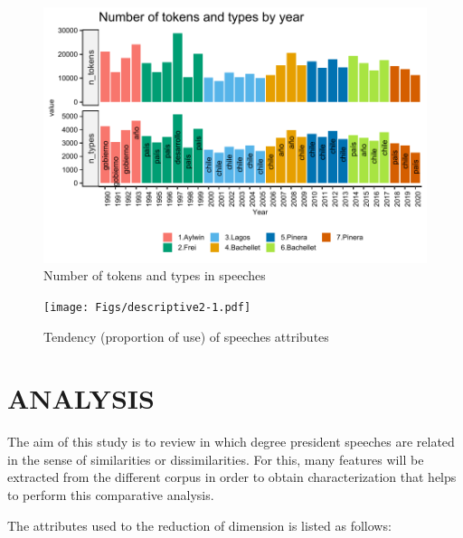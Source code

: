\documentclass[
  12pt,
]{article}
\begin{document}
\begin{figure}
\centering
\includegraphics{Figs/descriptive1-1.pdf}
\caption{\label{fig:descriptive1}Number of tokens and types in speeches}
\end{figure}

\begin{figure}
\centering
\texttt{[image: Figs/descriptive2-1.pdf]}
\caption{\label{fig:descriptive2}Tendency (proportion of use) of speeches attributes}
\end{figure}

\newpage

\hypertarget{analysis}{%
\section{ANALYSIS}\label{analysis}}

The aim of this study is to review in which degree president speeches are related in the sense of similarities or dissimilarities. For this, many features will be extracted from the different corpus in order to obtain characterization that helps to perform this comparative analysis.

The attributes used to the reduction of dimension is listed as follows:
\end{document}
